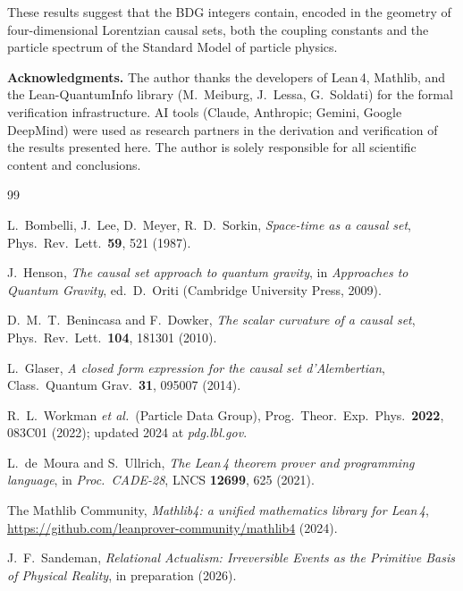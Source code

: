 \documentclass[11pt,twocolumn]{article}
\begin{document}
These results suggest that the BDG integers contain, encoded in
the geometry of four-dimensional Lorentzian causal sets, both the
coupling constants and the particle spectrum of the Standard Model
of particle physics.

\bigskip\noindent\textbf{Acknowledgments.}
The author thanks the developers of Lean\,4, Mathlib, and the
Lean-QuantumInfo library (M.~Meiburg, J.~Lessa, G.~Soldati) for
the formal verification infrastructure. AI tools (Claude,
Anthropic; Gemini, Google DeepMind) were used as research
partners in the derivation and verification of the results
presented here. The author is solely responsible for all
scientific content and conclusions.


\begin{thebibliography}{99}

  L.~Bombelli, J.~Lee, D.~Meyer, R.~D.~Sorkin,
  \textit{Space-time as a causal set},
  Phys.\ Rev.\ Lett.\ \textbf{59}, 521 (1987).

  J.~Henson,
  \textit{The causal set approach to quantum gravity},
  in \textit{Approaches to Quantum Gravity},
  ed.\ D.~Oriti (Cambridge University Press, 2009).

  D.~M.~T.~Benincasa and F.~Dowker,
  \textit{The scalar curvature of a causal set},
  Phys.\ Rev.\ Lett.\ \textbf{104}, 181301 (2010).

  L.~Glaser,
  \textit{A closed form expression for the causal set d'Alembertian},
  Class.\ Quantum Grav.\ \textbf{31}, 095007 (2014).

  R.~L.~Workman \textit{et al.}\ (Particle Data Group),
  Prog.\ Theor.\ Exp.\ Phys.\ \textbf{2022}, 083C01 (2022);
  updated 2024 at \textit{pdg.lbl.gov}.

  L.~de~Moura and S.~Ullrich,
  \textit{The Lean\,4 theorem prover and programming language},
  in \textit{Proc.\ CADE-28}, LNCS \textbf{12699}, 625 (2021).

  The Mathlib Community,
  \textit{Mathlib4: a unified mathematics library for Lean\,4},
  \url{https://github.com/leanprover-community/mathlib4} (2024).

  J.~F.~Sandeman,
  \textit{Relational Actualism: Irreversible Events as the
  Primitive Basis of Physical Reality},
  in preparation (2026).

\end{thebibliography}
\end{document}
